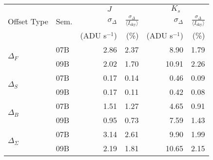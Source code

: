 \begin{tabular}{ll|rr|rr}
&  & \multicolumn{2}{c|}{$J$} & \multicolumn{2}{c}{$K_s$} \\ %
Offset Type & Sem. & $\sigma_\Delta$ & $\frac{\sigma_\Delta}{\langle I_\mathrm{sky}\rangle }$ & $\sigma_\Delta$ & $\frac{\sigma_\Delta}{\langle I_\mathrm{sky}\rangle }$ \\
& & \tiny{(ADU s$^{-1}$)} &  \tiny{(\%)} & \tiny{(ADU s$^{-1}$)} &  \tiny{(\%)} \\
\hline
\multirow{2}{*}{$\Delta_F$} & 07B & 2.86 & 2.37 & 8.90 & 1.79 \\
& 09B  & 2.02 & 1.70 & 10.91 & 2.26 \\
\hline
\multirow{2}{*}{$\Delta_S$} & 07B & 0.17 & 0.14 & 0.46 & 0.09 \\
& 09B & 0.17 & 0.11 & 0.42 & 0.08 \\
\hline
\multirow{2}{*}{$\Delta_B$} & 07B & 1.51 & 1.27 & 4.65 & 0.91 \\
& 09B &  0.95 & 0.73 & 7.59 & 1.43 \\
\hline
\multirow{2}{*}{$\Delta_\Sigma$} & 07B &  3.14 & 2.61 & 9.90 & 1.99 \\
& 09B &  2.19 & 1.81 & 10.65 & 2.15 \\
\end{tabular}